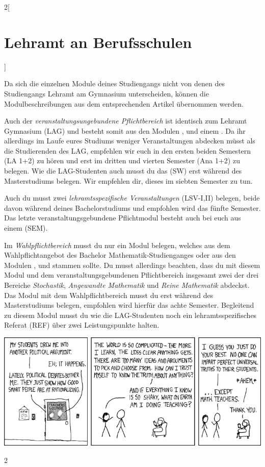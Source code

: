 \begin{multicols}{2}[\section{Lehramt an Berufsschulen}]

Da sich die einzelnen Module deines Studiengangs nicht von denen des
Studiengangs Lehramt am Gymnasium unterscheiden, können die Modulbeschreibungen
aus dem entsprechenden Artikel übernommen werden.

Auch der \emph{veranstaltungsungebundene Pflichtbereich} ist identisch zum
Lehramt Gymnasium (LAG) und besteht somit aus den Modulen ,
 und einem
. Da ihr allerdings im Laufe eures Studiums weniger
Veranstaltungen abdecken müsst als die Studierenden des LAG, empfehlen wir euch
in den ersten beiden Semestern  (LA 1+2) zu hören und erst im dritten und vierten Semester
 (Ana 1+2) zu belegen. Wie die LAG-Studenten auch musst du
das  (SW) erst während des Masterstudiums belegen. Wir
empfehlen dir, dieses im siebten Semester zu tun.

Auch du musst zwei \emph{lehramtsspezifische Veranstaltungen} (LSV-I,II)
belegen, beide davon während deines Bachelorstudiums und empfohlen wird das
fünfte Semester. Das letzte veranstaltungsgebundene Pflichtmodul besteht auch
bei euch aus einem  (SEM).

Im \emph{Wahlpflichtbereich} musst du nur ein Modul belegen, welches aus dem
Wahlpflichtangebot des Bachelor Mathematik-Studienganges oder aus den Modulen
,  und  stammen sollte. Du musst allerdings beachten, dass du mit diesem
Modul und dem veranstaltungsgebundenen Pflichtbereich insgesamt zwei der drei
Bereiche \emph{Stochastik}, \emph{Angewandte Mathematik} und \emph{Reine
Mathematik} abdeckst. Das Modul mit dem Wahlpflichtbereich musst du erst
während des Masterstudiums belegen, empfohlen wird hierfür das achte Semester.
Begleitend zu diesem Modul musst du wie die LAG-Studenten noch ein
lehramtsspezifisches Referat (REF) über zwei Leistungspunkte halten.

\end{multicols}
\begin{center}
\includegraphics[scale=7]{comics/263}
\end{center}
\begin{multicols}{2}

\end{multicols}
\clearpage
